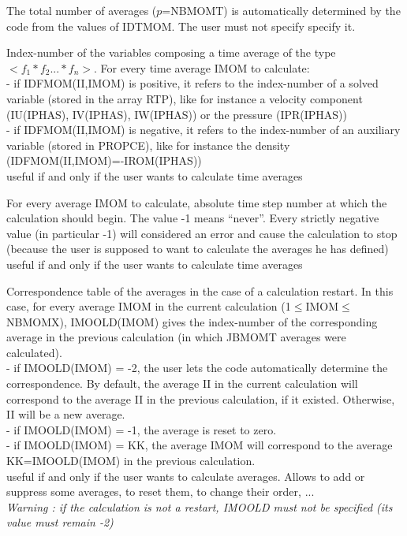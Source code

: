 The total number of averages ($p$=NBMOMT) is automatically determined by
the code from the values of IDTMOM. The user must not specify specify it.

{Index-number of the variables composing a time average of the type
$<f_1*f_2...*f_n>$. For every time average IMOM to calculate:\\
\hspace*{1.3cm} - if IDFMOM(II,IMOM) is positive, it refers to the
		  index-number of a solved variable (stored in the array
		  RTP), like for instance a velocity component
		  (IU(IPHAS), IV(IPHAS), IW(IPHAS)) or the pressure
		  (IPR(IPHAS))\\
\hspace*{1.3cm} - if IDFMOM(II,IMOM) is negative, it refers to the
		  index-number of an auxiliary variable (stored in
		  PROPCE), like for instance the density
		  (IDFMOM(II,IMOM)=-IROM(IPHAS))\\ 
useful if and only if the user wants to calculate time averages}

{For every average IMOM to calculate, absolute time step number at which
the calculation should begin. The value -1 means ``never''. Every
strictly negative value (in particular -1) will considered an error and
cause the calculation to stop (because the user is supposed to want to
calculate the averages he has defined)\\
useful if and only if the user wants to calculate time averages}

{Correspondence table of the averages in the case of a calculation
restart. In this case, for every average IMOM in the current
calculation (1$\leqslant$IMOM$\leqslant$NBMOMX), IMOOLD(IMOM) gives the
index-number of the corresponding average in the previous calculation
(in which JBMOMT averages were calculated). \\
\hspace*{1.3cm} - if IMOOLD(IMOM) = -2, the user lets the code automatically
            determine the
		correspondence. By default, the average II in the
		current calculation will correspond to the average II in
		the previous calculation, if it existed.
		Otherwise, II will be a new average.\\
\hspace*{1.3cm} - if IMOOLD(IMOM) = -1, the average is reset to zero.\\
\hspace*{1.3cm} - if IMOOLD(IMOM) = KK, the average IMOM will correspond
to the average KK=IMOOLD(IMOM) in the previous calculation.\\
useful if and only if the user wants to calculate averages. 
Allows to add or suppress some averages, to reset them, to change their
order, ...\\
{\em Warning : if the calculation is not a restart, IMOOLD must not be
specified (its value must remain -2)}} 

